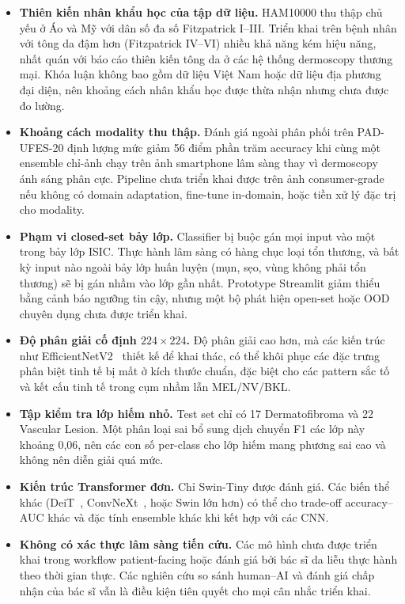 \begin{itemize}
    \item \textbf{Thiên kiến nhân khẩu học của tập dữ liệu.} HAM10000 thu thập chủ yếu ở Áo và Mỹ với dân số đa số Fitzpatrick I--III. Triển khai trên bệnh nhân với tông da đậm hơn (Fitzpatrick IV--VI) nhiều khả năng kém hiệu năng, nhất quán với báo cáo thiên kiến tông da ở các hệ thống dermoscopy thương mại. Khóa luận không bao gồm dữ liệu Việt Nam hoặc dữ liệu địa phương đại diện, nên khoảng cách nhân khẩu học được thừa nhận nhưng chưa được đo lường.
    \item \textbf{Khoảng cách modality thu thập.} Đánh giá ngoài phân phối trên PAD-UFES-20 định lượng mức giảm 56 điểm phần trăm accuracy khi cùng một ensemble chỉ-ảnh chạy trên ảnh smartphone lâm sàng thay vì dermoscopy ánh sáng phân cực. Pipeline chưa triển khai được trên ảnh consumer-grade nếu không có domain adaptation, fine-tune in-domain, hoặc tiền xử lý đặc trị cho modality.
    \item \textbf{Phạm vi closed-set bảy lớp.} Classifier bị buộc gán mọi input vào một trong bảy lớp ISIC. Thực hành lâm sàng có hàng chục loại tổn thương, và bất kỳ input nào ngoài bảy lớp huấn luyện (mụn, sẹo, vùng không phải tổn thương) sẽ bị gán nhầm vào lớp gần nhất. Prototype Streamlit giảm thiểu bằng cảnh báo ngưỡng tin cậy, nhưng một bộ phát hiện open-set hoặc OOD chuyên dụng chưa được triển khai.
    \item \textbf{Độ phân giải cố định $224 \times 224$.} Độ phân giải cao hơn, mà các kiến trúc như EfficientNetV2~\cite{tan2021efficientnetv2} thiết kế để khai thác, có thể khôi phục các đặc trưng phân biệt tinh tế bị mất ở kích thước chuẩn, đặc biệt cho các pattern sắc tố và kết cấu tinh tế trong cụm nhầm lẫn MEL/NV/BKL.
    \item \textbf{Tập kiểm tra lớp hiếm nhỏ.} Test set chỉ có 17 Dermatofibroma và 22 Vascular Lesion. Một phân loại sai bổ sung dịch chuyển F1 các lớp này khoảng 0,06, nên các con số per-class cho lớp hiếm mang phương sai cao và không nên diễn giải quá mức.
    \item \textbf{Kiến trúc Transformer đơn.} Chỉ Swin-Tiny được đánh giá. Các biến thể khác (DeiT~\cite{touvron2021deit}, ConvNeXt~\cite{liu2022convnext}, hoặc Swin lớn hơn) có thể cho trade-off accuracy--AUC khác và đặc tính ensemble khác khi kết hợp với các CNN.
    \item \textbf{Không có xác thực lâm sàng tiến cứu.} Các mô hình chưa được triển khai trong workflow patient-facing hoặc đánh giá bởi bác sĩ da liễu thực hành theo thời gian thực. Các nghiên cứu so sánh human--AI và đánh giá chấp nhận của bác sĩ vẫn là điều kiện tiên quyết cho mọi cân nhắc triển khai.
\end{itemize}

